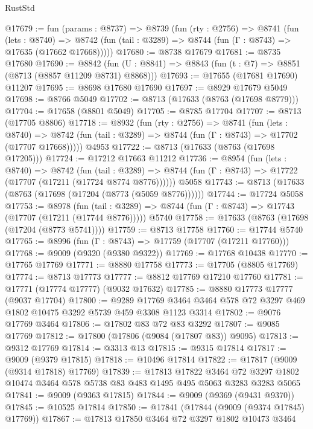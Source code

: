 \begin{lexlean}{RustStd}
\begin{coremodule}
@17679 := fun (params : @8737) =>
  @8739
    (fun (rty : @2756) =>
    @8741
      (fun (lets : @8740) =>
      @8742 (fun (tail : @3289) => @8744 (fun (Γ : @8743) => @17635 (@17662 @17668)))))
@17680 := @8738 @17679
@17681 := @8735 @17680
@17690 := @8842
    (fun (U : @8841) => @8843 (fun (t : @7) => @8851 (@8713 (@8857 @11209 @8731) @8868)))
@17693 := @17655 (@17681 @17690) @11207
@17695 := @8698 @17680 @17690
@17697 := @8929 @17679 @5049
@17698 := @8766 @5049
@17702 := @8713 (@17633 (@8763 (@17698 @8779)))
@17704 := @17658 (@8801 @5049)
@17705 := @8785 @17704
@17707 := @8713 (@17705 @8806)
@17718 := @8932
    (fun (rty : @2756) =>
    @8741
      (fun (lets : @8740) =>
      @8742 (fun (tail : @3289) => @8744 (fun (Γ : @8743) => @17702 (@17707 @17668)))))
    @4953
@17722 := @8713 (@17633 (@8763 (@17698 @17205)))
@17724 := @17212 @17663 @11212
@17736 := @8954
    (fun (lets : @8740) =>
    @8742
      (fun (tail : @3289) =>
      @8744 (fun (Γ : @8743) => @17722 (@17707 (@17211 (@17724 @8774 @8776))))))
    @5058
@17743 := @8713 (@17633 (@8763 (@17698 (@17204 (@8773 (@5059 @8776))))))
@17744 := @17724 @5058
@17753 := @8978
    (fun (tail : @3289) => @8744 (fun (Γ : @8743) => @17743 (@17707 (@17211 (@17744 @8776)))))
    @5740
@17758 := @17633 (@8763 (@17698 (@17204 (@8773 @5741))))
@17759 := @8713 @17758
@17760 := @17744 @5740
@17765 := @8996 (fun (Γ : @8743) => @17759 (@17707 (@17211 @17760)))
@17768 := @9009 (@9320 (@9380 @9322))
@17769 := @17768 @10438
@17770 := @17765 @17769
@17771 := @8880 @17758
@17773 := @17705 (@8805 @17769)
@17774 := @8713 @17773
@17777 := @8812 @17769 @17210 @17760
@17781 := @17771 (@17774 @17777) (@9032 @17632)
@17785 := @8880 @17773 @17777 (@9037 @17704)
@17800 := @9289
    @17769
    @3464
    @3464
    @578
    @72
    @3297
    @469
    @1802
    @10475
    @3292
    @5739
    @459
    @3308
    @1123
    @3314
@17802 := @9076 @17769 @3464
@17806 := @17802 @83 @72 @83 @3292
@17807 := @9085 @17769
@17812 := @17800 (@17806 (@9084 (@17807 @83)) @9095)
@17813 := @9312 @17769
@17814 := @3313 @13
@17815 := @9315 @17814
@17817 := @9009 (@9379 @17815)
@17818 := @10496 @17814
@17822 := @17817 (@9009 (@9314 @17818) @17769)
@17839 := @17813
    @17822
    @3464
    @72
    @3297
    @1802
    @10474
    @3464
    @578
    @5738
    @83
    @483
    @1495
    @495
    @5063
    @3283
    @3283
    @5065
@17841 := @9009 (@9363 @17815)
@17844 := @9009 (@9369 (@9431 @9370))
@17845 := @10525 @17814
@17850 := @17841 (@17844 (@9009 (@9374 @17845) @17769))
@17867 := @17813
    @17850
    @3464
    @72
    @3297
    @1802
    @10473
    @3464

\end{coremodule}
\end{lexlean}
